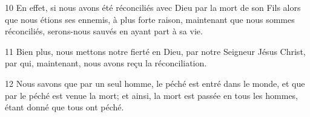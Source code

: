 
10 En effet, si nous avons été réconciliés avec Dieu par la mort de son Fils alors que nous étions ses ennemis, à plus forte raison, maintenant que nous sommes réconciliés, serons-nous sauvés en ayant part à sa vie.

11 Bien plus, nous mettons notre fierté en Dieu, par notre Seigneur Jésus Christ, par qui, maintenant, nous avons reçu la réconciliation.

12 Nous savons que par un seul homme, le péché est entré dans le monde, et que par le péché est venue la mort; et ainsi, la mort est passée en tous les hommes, étant donné que tous ont péché.
